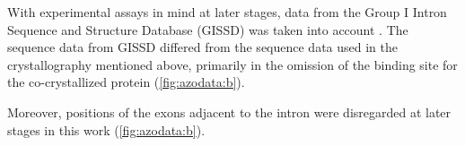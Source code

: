 \documentclass[../../master.tex]{subfiles}
\begin{document}
With experimental assays in mind at later stages, data from the Group I Intron Sequence and Structure Database (GISSD) was taken into account \parencite{zhou_gissd_2008}.
The sequence data from GISSD differed from the sequence data used in the crystallography mentioned above, primarily in the omission of the binding site for the co-crystallized protein (\autoref{fig:azodata:b}).


Moreover, positions of the exons adjacent to the intron were disregarded at later stages in this work (\autoref{fig:azodata:b}).
\end{document}
